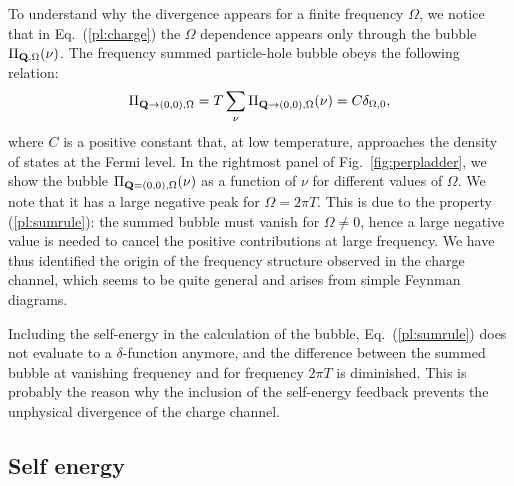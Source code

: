To understand why the divergence appears for a finite frequency $\Omega$, we notice that in Eq.~(\ref{pl:charge}) the $\Omega$ dependence 
appears only through the bubble $\Pi_{\mathbf{Q},\Omega}(\nu)$. The frequency summed particle-hole bubble obeys the following relation:  
\begin{equation}
 \Pi_{\mathbf{Q}\rightarrow(0,0),\Omega} = T \sum_{\nu}
 \Pi_{\mathbf{Q}\rightarrow(0,0),\Omega}(\nu) = C \delta_{\Omega,0},
\label{pl:sumrule}
\end{equation}
where $C$ is a positive constant that, at low temperature, approaches the density of states at the Fermi level.
In the rightmost panel of Fig.~\ref{fig:perpladder}, we show the bubble $\Pi_{\mathbf{Q}=(0,0),\Omega}(\nu)$ as a function of $\nu$ for different values of $\Omega$.
We note that it has a large negative peak for $\Omega=2\pi T$.
This is due to the property (\ref{pl:sumrule}): the summed bubble must vanish for $\Omega \neq 0$, hence a large negative value is needed to cancel the positive contributions at large frequency. 
We have thus identified the origin of the frequency structure observed in the charge channel, which seems to be quite general and arises from simple Feynman diagrams. 

Including the self-energy in the calculation of the bubble,   Eq.~(\ref{pl:sumrule}) does not evaluate to a $\delta$-function anymore, and the difference between the summed bubble at vanishing frequency and for frequency $2\pi T$ is diminished. 
This is probably the reason why the inclusion of the self-energy feedback prevents the unphysical divergence of the charge channel.     


\subsection{Self energy}

